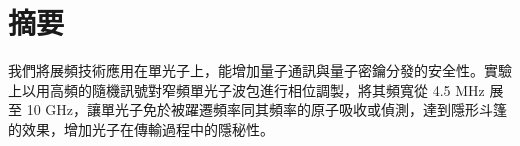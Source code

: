 \documentclass[class=NCU_thesis, crop=false]{standalone}
\begin{document}
\chapter{摘要}
我們將展頻技術應用在單光子上，能增加量子通訊與量子密鑰分發的安全性。實驗上以用高頻的隨機訊號對窄頻單光子波包進行相位調製，將其頻寬從 4.5 MHz 展至 10 GHz，讓單光子免於被躍遷頻率同其頻率的原子吸收或偵測，達到隱形斗篷的效果，增加光子在傳輸過程中的隱秘性。


\vspace{2em}
\end{document}
